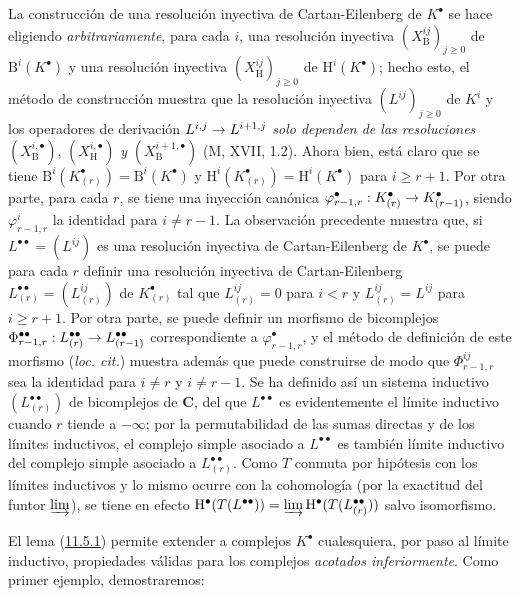 \documentclass[10pt,oneside,openany]{book}
\theoremstyle{egaenv}\newtheorem*{env}{---}
\theoremstyle{egastatement}
\theoremstyle{egadescription}
\renewcommand{\geq}{\geqslant}
\renewcommand{\to}{\mathchoice{\longrightarrow}{\rightarrow}{\rightarrow}{\rightarrow}}
\begin{document}
La construcción de una resolución inyectiva de Cartan-Eilenberg de $K^\bullet$ se hace eligiendo \emph{arbitrariamente}, para cada $i$, una resolución inyectiva $(X_{\mathrm B}^{ij})_{j\geq0}$ de $\mathrm B^i(K^\bullet)$ y una resolución inyectiva $(X_{\mathrm H}^{ij})_{j\geq0}$ de $\mathrm H^i(K^\bullet)$; hecho esto, el método de construcción muestra que la resolución inyectiva $(L^{ij})_{j\geq0}$ de $K^i$ y los operadores de derivación $L^{i,j}\to L^{i+1,j}$ \emph{solo dependen de las resoluciones} $(X_{\mathrm B}^{i,\bullet})$, $(X_{\mathrm H}^{i,\bullet})$ \emph{y} $(X_{\mathrm B}^{i+1,\bullet})$ (M, XVII, 1.2). Ahora bien, está claro que se tiene $\mathrm B^i(K_{(r)}^\bullet)=\mathrm B^i(K^\bullet)$ y $\mathrm H^i(K_{(r)}^\bullet)=\mathrm H^i(K^\bullet)$ para $i\geq r+1$. Por otra parte, para cada $r$, se tiene una inyección canónica $\varphi_{r-1,r}^\bullet:K_{(r)}^\bullet\to K_{(r-1)}^\bullet$, siendo $\varphi_{r-1,r}^i$ la identidad para $i\neq r-1$. La observación precedente muestra que, si $L^{\bullet\bullet}=(L^{ij})$ es una resolución inyectiva de Cartan-Eilenberg de $K^\bullet$, se puede para cada $r$ definir una resolución inyectiva de Cartan-Eilenberg $L_{(r)}^{\bullet\bullet}=(L_{(r)}^{ij})$ de $K_{(r)}^\bullet$ tal que $L_{(r)}^{ij}=0$ para $i<r$ y $L_{(r)}^{ij}=L^{ij}$ para $i\geq r+1$. Por otra parte, se puede definir un morfismo de bicomplejos $\Phi_{r-1,r}^{\bullet\bullet}:L_{(r)}^{\bullet\bullet}\to
L_{(r-1)}^{\bullet\bullet}$ correspondiente a $\varphi_{r-1,r}^\bullet$, y el método de definición de este morfismo (\emph{loc. cit.}) muestra además que puede construirse de modo que $\Phi_{r-1,r}^{ij}$ sea la identidad para $i\neq r$ y $i\neq r-1$. Se ha definido así un sistema inductivo $(L_{(r)}^{\bullet\bullet})$ de bicomplejos de $\boldsymbol{C}$, del que $L^{\bullet\bullet}$ es evidentemente el límite inductivo cuando $r$ tiende a $-\infty$; por la permutabilidad de las sumas directas y de los límites inductivos, el complejo simple asociado a $L^{\bullet\bullet}$ es también límite inductivo del complejo simple asociado a $L_{(r)}^{\bullet\bullet}$. Como $T$ conmuta por hipótesis con los límites inductivos y lo mismo ocurre con la cohomología (por la exactitud del funtor $\varinjlim$), se tiene en efecto $\mathrm H^\bullet(T(L^{\bullet\bullet}))=\varinjlim\mathrm H^\bullet(T(L_{(r)}^{\bullet\bullet}))$ salvo isomorfismo.

El lema (\hyperref[0.11.5.1-fr]{11.5.1}) permite extender a complejos $K^\bullet$ cualesquiera, por paso al límite inductivo, propiedades válidas para los complejos \emph{acotados inferiormente}. Como primer ejemplo, demostraremos:
\end{document}
